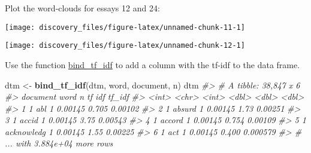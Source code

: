 \documentclass[]{book}
\newenvironment{Shaded}{\begin{snugshade}}{\end{snugshade}}
\newcommand{\KeywordTok}[1]{\textcolor[rgb]{0.13,0.29,0.53}{\textbf{#1}}}
\newcommand{\DataTypeTok}[1]{\textcolor[rgb]{0.13,0.29,0.53}{#1}}
\newcommand{\DecValTok}[1]{\textcolor[rgb]{0.00,0.00,0.81}{#1}}
\newcommand{\StringTok}[1]{\textcolor[rgb]{0.31,0.60,0.02}{#1}}
\newcommand{\CommentTok}[1]{\textcolor[rgb]{0.56,0.35,0.01}{\textit{#1}}}
\newcommand{\OperatorTok}[1]{\textcolor[rgb]{0.81,0.36,0.00}{\textbf{#1}}}
\newcommand{\NormalTok}[1]{#1}
\theoremstyle{definition}
\theoremstyle{definition}
\theoremstyle{definition}
\theoremstyle{remark}
\begin{document}
Plot the word-clouds for essays 12 and 24:

\begin{Shaded}
\end{Shaded}

\begin{center}\texttt{[image: discovery\_files/figure-latex/unnamed-chunk-11-1]} \end{center}

\begin{Shaded}
\end{Shaded}

\begin{center}\texttt{[image: discovery\_files/figure-latex/unnamed-chunk-12-1]} \end{center}

Use the function
\href{https://www.rdocumentation.org/packages/tidytext/topics/bind_tf_idf}{bind\_tf\_idf}
to add a column with the tf-idf to the data frame.

\begin{Shaded}
\begin{Highlighting}[]
\NormalTok{dtm <-}\StringTok{ }\KeywordTok{bind_tf_idf}\NormalTok{(dtm, word, document, n)}
\NormalTok{dtm}
\CommentTok{#> # A tibble: 38,847 x 6}
\CommentTok{#>   document word           n      tf   idf   tf_idf}
\CommentTok{#>      <int> <chr>      <int>   <dbl> <dbl>    <dbl>}
\CommentTok{#> 1        1 abl            1 0.00145 0.705 0.00102 }
\CommentTok{#> 2        1 absurd         1 0.00145 1.73  0.00251 }
\CommentTok{#> 3        1 accid          1 0.00145 3.75  0.00543 }
\CommentTok{#> 4        1 accord         1 0.00145 0.754 0.00109 }
\CommentTok{#> 5        1 acknowledg     1 0.00145 1.55  0.00225 }
\CommentTok{#> 6        1 act            1 0.00145 0.400 0.000579}
\CommentTok{#> # ... with 3.884e+04 more rows}
\end{Highlighting}
\end{Shaded}
\end{document}

